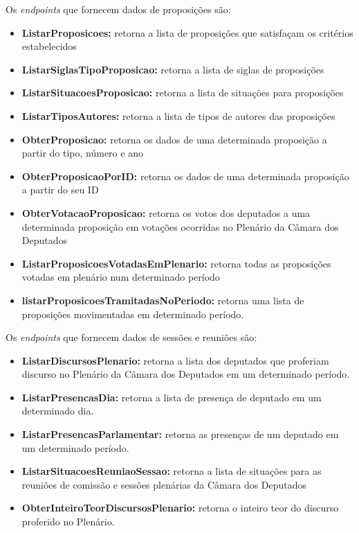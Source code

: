 Os \textit{endpoints} que fornecem dados de proposições são:

\begin{itemize}
    \item \textbf{ListarProposicoes:} retorna a lista de proposições que satisfaçam os critérios estabelecidos
    \item \textbf{ListarSiglasTipoProposicao:} retorna a lista de siglas de proposições
    \item \textbf{ListarSituacoesProposicao:} retorna a lista de situações para proposições
    \item \textbf{ListarTiposAutores:} retorna a lista de tipos de autores das proposições
    \item \textbf{ObterProposicao:} retorna os dados de uma determinada proposição a partir do tipo, número e ano
    \item \textbf{ObterProposicaoPorID:} retorna os dados de uma determinada proposição a partir do seu ID
    \item \textbf{ObterVotacaoProposicao:} retorna os votos dos deputados a uma determinada proposição em votações ocorridas no Plenário da Câmara dos Deputados
    \item \textbf{ListarProposicoesVotadasEmPlenario:} retorna todas as proposições votadas em plenário num determinado período
    \item \textbf{listarProposicoesTramitadasNoPeriodo:} retorna uma lista de proposições movimentadas em determinado período.
\end{itemize}

Os \textit{endpoints} que fornecem dados de sessões e reuniões são:

\begin{itemize}
    \item \textbf{ListarDiscursosPlenario:} retorna a lista dos deputados que proferiam discurso no Plenário da Cãmara dos Deputados em um determinado período.
    \item \textbf{ListarPresencasDia:} retorna a lista de presença de deputado em um determinado dia.
    \item \textbf{ListarPresencasParlamentar:} retorna as presenças de um deputado em um determinado período.
    \item \textbf{ListarSituacoesReuniaoSessao:} retorna a lista de situações para as reuniões de comissão e sessões plenárias da Câmara dos Deputados
    \item \textbf{ObterInteiroTeorDiscursosPlenario:} retorna o inteiro teor do discurso proferido no Plenário.
\end{itemize}
